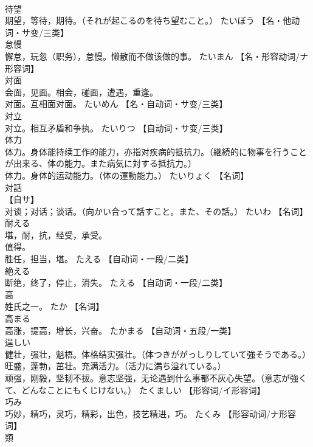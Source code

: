 \documentclass[8pt]{extreport}
\begin{document}
\begin{CJK}{UTF8}{min}
\\	待望	
\\	期望，等待，期待。（それが起こるのを待ち望むこと。）	たいぼう		【名・他动词・サ变/三类】
\\	怠慢	
\\	懈怠，玩忽（职务），怠慢。懒散而不做该做的事。	たいまん		【名・形容动词/ナ形容词】
\\	対面	
\\	会面，见面。相会，碰面，遭遇，重逢。 
\\	对面。互相面对面。	たいめん		【名・自动词・サ变/三类】
\\	対立	
\\	对立。相互矛盾和争执。	たいりつ		【自动词・サ变/三类】
\\	体力	
\\	体力。身体能持续工作的能力，亦指对疾病的抵抗力。（継続的に物事を行うことが出来る、体の能力。また病気に対する抵抗力。） 
\\	体力。身体的运动能力。（体の運動能力。）	たいりょく		【名词】
\\	対話	
\\	【自サ】 
\\	对谈；对话；谈话。（向かい合って話すこと。また、その話。）	たいわ		【名词】
\\	耐える	
\\	堪，耐，抗，经受，承受。 
\\	值得。 
\\	胜任，担当，堪。	たえる		【自动词・一段/二类】
\\	絶える	
\\	断绝，终了，停止，消失。	たえる		【自动词・一段/二类】
\\	高	
\\	姓氏之一。	たか		【名词】
\\	高まる	
\\	高涨，提高，增长，兴奋。	たかまる		【自动词・五段/一类】
\\	逞しい	
\\	健壮，强壮，魁梧。体格结实强壮。（体つきががっしりしていて強そうである。） 
\\	旺盛，蓬勃，茁壮。充满活力。（活力に満ち溢れている。） 
\\	顽强，刚毅，坚韧不拔。意志坚强，无论遇到什么事都不灰心失望。（意志が強くて、どんなことにもくじけない。）	たくましい		【形容词/イ形容词】
\\	巧み	
\\	巧妙，精巧，灵巧，精彩，出色，技艺精进，巧。	たくみ		【形容动词/ナ形容词】
\\	類	

\end{CJK}
\end{document}
